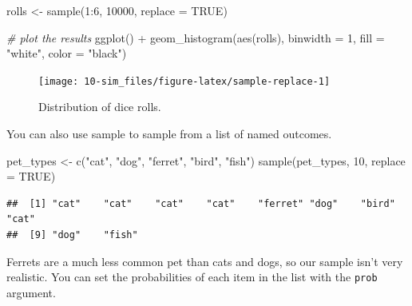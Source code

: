 \documentclass[
  oneside]{book}
\newenvironment{Shaded}{\begin{snugshade}}{\end{snugshade}}
\newcommand{\AttributeTok}[1]{\textcolor[rgb]{0.77,0.63,0.00}{#1}}
\newcommand{\CommentTok}[1]{\textcolor[rgb]{0.56,0.35,0.01}{\textit{#1}}}
\newcommand{\ConstantTok}[1]{\textcolor[rgb]{0.00,0.00,0.00}{#1}}
\newcommand{\DecValTok}[1]{\textcolor[rgb]{0.00,0.00,0.81}{#1}}
\newcommand{\FunctionTok}[1]{\textcolor[rgb]{0.00,0.00,0.00}{#1}}
\newcommand{\NormalTok}[1]{#1}
\newcommand{\OtherTok}[1]{\textcolor[rgb]{0.56,0.35,0.01}{#1}}
\newcommand{\SpecialCharTok}[1]{\textcolor[rgb]{0.00,0.00,0.00}{#1}}
\newcommand{\StringTok}[1]{\textcolor[rgb]{0.31,0.60,0.02}{#1}}
\begin{document}
\begin{Shaded}
\begin{Highlighting}[]
\NormalTok{rolls }\OtherTok{\textless{}{-}} \FunctionTok{sample}\NormalTok{(}\DecValTok{1}\SpecialCharTok{:}\DecValTok{6}\NormalTok{, }\DecValTok{10000}\NormalTok{, }\AttributeTok{replace =} \ConstantTok{TRUE}\NormalTok{)}

\CommentTok{\# plot the results}
\FunctionTok{ggplot}\NormalTok{() }\SpecialCharTok{+} 
  \FunctionTok{geom\_histogram}\NormalTok{(}\FunctionTok{aes}\NormalTok{(rolls), }\AttributeTok{binwidth =} \DecValTok{1}\NormalTok{, }
                 \AttributeTok{fill =} \StringTok{"white"}\NormalTok{, }\AttributeTok{color =} \StringTok{"black"}\NormalTok{)}
\end{Highlighting}
\end{Shaded}

\begin{figure}

{\centering \texttt{[image: 10-sim\_files/figure-latex/sample-replace-1]} 

}

\caption{Distribution of dice rolls.}\label{fig:sample-replace}
\end{figure}

You can also use sample to sample from a list of named outcomes.

\begin{Shaded}
\begin{Highlighting}[]
\NormalTok{pet\_types }\OtherTok{\textless{}{-}} \FunctionTok{c}\NormalTok{(}\StringTok{"cat"}\NormalTok{, }\StringTok{"dog"}\NormalTok{, }\StringTok{"ferret"}\NormalTok{, }\StringTok{"bird"}\NormalTok{, }\StringTok{"fish"}\NormalTok{)}
\FunctionTok{sample}\NormalTok{(pet\_types, }\DecValTok{10}\NormalTok{, }\AttributeTok{replace =} \ConstantTok{TRUE}\NormalTok{)}
\end{Highlighting}
\end{Shaded}

\begin{verbatim}
##  [1] "cat"    "cat"    "cat"    "cat"    "ferret" "dog"    "bird"   "cat"   
##  [9] "dog"    "fish"
\end{verbatim}

Ferrets are a much less common pet than cats and dogs, so our sample isn't very realistic. You can set the probabilities of each item in the list with the \texttt{prob} argument.
\end{document}
